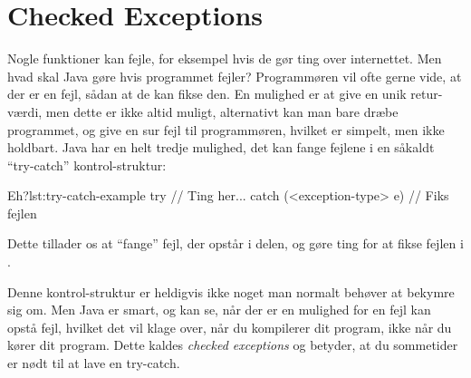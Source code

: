 \section{Checked Exceptions}

	Nogle funktioner kan fejle, for eksempel hvis de gør ting over internettet.
	Men hvad skal Java gøre hvis programmet fejler? Programmøren vil ofte gerne
	vide, at der er en fejl, sådan at de kan fikse den. En mulighed er at give en
	unik retur-værdi, men dette er ikke altid muligt, alternativt kan man bare
	dræbe programmet, og give en sur fejl til programmøren, hvilket er simpelt,
	men ikke holdbart. Java har en helt tredje mulighed, det kan fange fejlene i
	en såkaldt ``try-catch'' kontrol-struktur:

	\begin{JavaCode}{Eh?}{lst:try-catch-example}
		try {
			// Ting her...
		} catch (<exception-type> e) {
			// Fiks fejlen
		}
	\end{JavaCode}

	Dette tillader os at ``fange'' fejl, der opstår i 
	delen, og gøre ting for at fikse fejlen i .

	Denne kontrol-struktur er heldigvis ikke noget man normalt behøver at bekymre
	sig om. Men Java er smart, og kan se, når der er en mulighed for en fejl kan opstå
	fejl, hvilket det vil klage over, når du kompilerer dit program, ikke når du
	kører dit program. Dette kaldes \emph{checked exceptions} og betyder, at du
	sommetider er nødt til at lave en try-catch.



